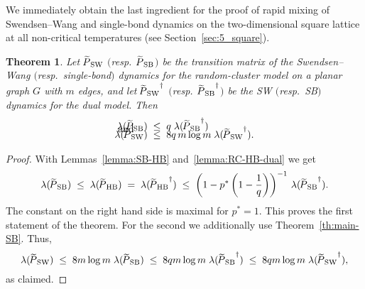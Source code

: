 \documentclass{dis}
\newtheorem{theorem}{Theorem}[chapter]
\theoremstyle{citing}
\begin{document}
We immediately obtain the last ingredient for the proof 
of rapid mixing of Swendsen--Wang and single-bond dynamics 
on the two-dimensional square lattice at all non-critical 
temperatures (see Section~\ref{sec:5_square}).

\vspace{2mm}

\goodbreak

\begin{theorem} \label{th:SW-SB_dual}
Let ${{\raisebox{2pt}{ ${\widetilde{{}}}$ }\mkern-14mu P}_{\rm SW}}$ $($resp.~${{\raisebox{2pt}{ ${\widetilde{{}}}$ }\mkern-14mu P}_{\rm SB}}$$)$ be the transition matrix of the 
Swendsen--Wang $($resp.~single-bond\/$)$ dynamics for the 
random-cluster model on a planar graph $G$ with $m$ edges, 
and let ${{\raisebox{2pt}{ ${\widetilde{{}}}$ }\mkern-14mu P}_{\rm SW}}^\dag$ $($resp.~${{\raisebox{2pt}{ ${\widetilde{{}}}$ }\mkern-14mu P}_{\rm SB}}^\dag$$)$ be the SW $($resp.~SB$)$ 
dynamics for the dual model.
Then \vspace{1mm}
\begin{align*}
\lambda({{\raisebox{2pt}{ ${\widetilde{{}}}$ }\mkern-14mu P}_{\rm SB}}) \;&\le\; q \; \lambda({{\raisebox{2pt}{ ${\widetilde{{}}}$ }\mkern-14mu P}_{\rm SB}}^\dag) \\[-5mm]
\intertext{\vspace*{-4mm} and}
\lambda({{\raisebox{2pt}{ ${\widetilde{{}}}$ }\mkern-14mu P}_{\rm SW}}) \;&\le\; 8q\, m \log m\; \lambda({{\raisebox{2pt}{ ${\widetilde{{}}}$ }\mkern-14mu P}_{\rm SW}}^\dag).
\end{align*}
\end{theorem}
\vspace{2mm}

\begin{proof}
With Lemmas~\ref{lemma:SB-HB} and~\ref{lemma:RC-HB-dual} 
we get 
\[
\lambda({{\raisebox{2pt}{ ${\widetilde{{}}}$ }\mkern-14mu P}_{\rm SB}}) \;\le\; \lambda({{\raisebox{2pt}{ ${\widetilde{{}}}$ }\mkern-14mu P}_{\rm HB}}) 
\;=\; \lambda({{\raisebox{2pt}{ ${\widetilde{{}}}$ }\mkern-14mu P}_{\rm HB}}^\dag) 
\;\le\; \left(1-p^* \left(1-\frac1q\right)\right)^{-1}\,
				\lambda({{\raisebox{2pt}{ ${\widetilde{{}}}$ }\mkern-14mu P}_{\rm SB}}^\dag).
\]
The constant on the right hand side is maximal for $p^*=1$. 
This proves the first statement of the theorem. 
For the second we additionally use Theorem~\ref{th:main-SB}. 
Thus, 
\[
\lambda({{\raisebox{2pt}{ ${\widetilde{{}}}$ }\mkern-14mu P}_{\rm SW}}) \;\le\; 8 m \log m\; \lambda({{\raisebox{2pt}{ ${\widetilde{{}}}$ }\mkern-14mu P}_{\rm SB}}) 
\;\le\; 8 q m \log m\; \lambda({{\raisebox{2pt}{ ${\widetilde{{}}}$ }\mkern-14mu P}_{\rm SB}}^\dag) 
\;\le\; 8 q m \log m\; \lambda({{\raisebox{2pt}{ ${\widetilde{{}}}$ }\mkern-14mu P}_{\rm SW}}^\dag),
\vspace{-2mm}
\]
as claimed.
\end{proof}
\end{document}
